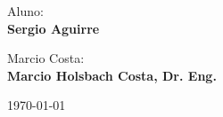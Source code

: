 \begin{titlepage}
\begin{figure}[!ht]
\begin{minipage}[c]{0.78\textwidth}
\begin{minipage}[t]{1\linewidth}
		
		
		\large
		Aluno:\\
	    \textbf{Sergio Aguirre}\\
		\large
		
		\vspace{3cm}
		
		Marcio Costa:\\
		\textbf{Marcio Holsbach Costa, Dr. Eng.}
		
				

		
		
		
		\vspace{3cm}
		\vfill
		
		\today $\quad$ \versao
  \end{minipage}
\end{minipage}
\end{figure}	
	
\end{titlepage}

\restoregeometry